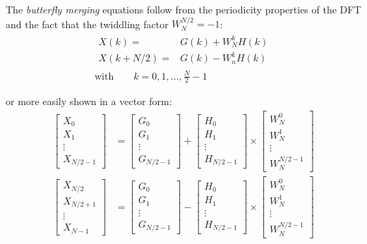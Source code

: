 The \emph{butterfly merging} equations follow from the periodicity properties
of the DFT and the fact that the twiddling factor $W_N^{N/2} = -1$:
\begin{align*}
	\begin{array}{rl}
		X(k) = & G(k) + W_N^k H(k) \\
		X(k+N/2) = & G(k) - W_n^k H(k)
	\end{array} \\
	\text{with}\qquad k=0,1,\ldots,\frac{N}{2}-1
\end{align*}

or more easily shown in a vector form:
\begin{align*}
	\begin{bmatrix}	X_0 \\ X_1 \\ \vdots \\ X_{N/2-1} \end{bmatrix} &=
	\begin{bmatrix}	G_0 \\ G_1 \\ \vdots \\ G_{N/2-1} \end{bmatrix} +
	\begin{bmatrix}	H_0 \\ H_1 \\ \vdots \\ H_{N/2-1} \end{bmatrix} \times
	\begin{bmatrix}	W^0_N \\ W^1_N \\ \vdots \\ W^{N/2-1}_N \end{bmatrix}
	\\
	\begin{bmatrix}	X_{N/2} \\ X_{N/2+1} \\ \vdots \\ X_{N-1} \end{bmatrix} &=
	\begin{bmatrix}	G_0 \\ G_1 \\ \vdots \\ G_{N/2-1} \end{bmatrix} -
	\begin{bmatrix}	H_0 \\ H_1 \\ \vdots \\ H_{N/2-1} \end{bmatrix} \times
	\begin{bmatrix}	W^0_N \\ W^1_N \\ \vdots \\ W^{N/2-1}_N \end{bmatrix}
\end{align*}

